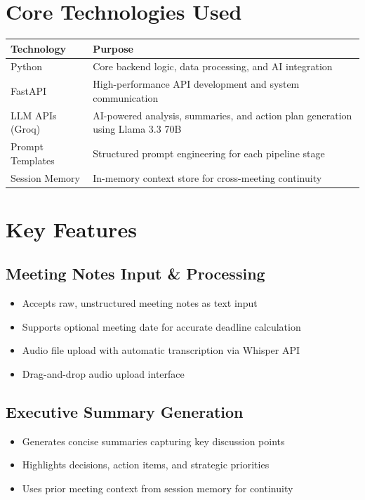 \documentclass[12pt,a4paper]{article}
\begin{document}
\section{Core Technologies Used}

\begin{longtable}{|p{4cm}|p{10cm}|}
\hline
\textbf{Technology} & \textbf{Purpose} \\
\hline
Python & Core backend logic, data processing, and AI integration \\
\hline
FastAPI & High-performance API development and system communication \\
\hline
LLM APIs (Groq) & AI-powered analysis, summaries, and action plan generation using Llama 3.3 70B \\
\hline
Prompt Templates & Structured prompt engineering for each pipeline stage \\
\hline
Session Memory & In-memory context store for cross-meeting continuity \\
\hline
\end{longtable}


\section{Key Features}

\subsection{Meeting Notes Input \& Processing}
\begin{itemize}
  \item Accepts raw, unstructured meeting notes as text input
  \item Supports optional meeting date for accurate deadline calculation
  \item Audio file upload with automatic transcription via Whisper API
  \item Drag-and-drop audio upload interface
\end{itemize}

\subsection{Executive Summary Generation}
\begin{itemize}
  \item Generates concise summaries capturing key discussion points
  \item Highlights decisions, action items, and strategic priorities
  \item Uses prior meeting context from session memory for continuity
\end{itemize}
\end{document}

